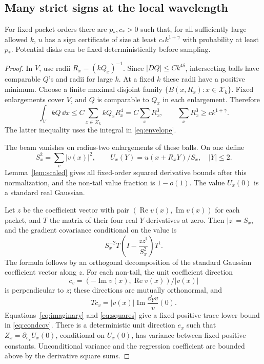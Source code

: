 \subsection{Many strict signs at the local wavelength}

\begin{lemma}\label{lem:signs}
For fixed packet orders there are \(p_*,c_*>0\) such that,
for all sufficiently large allowed \(k\), \(u\) has a sign
certificate of size at least \(c_*k^{1+\gamma}\) with
probability at least \(p_*\). Potential disks can be fixed
deterministically before sampling.
\end{lemma}

\begin{proof}
In \(V\), use radii \(R_x=(kQ_x)^{-1}\).
Since \(|D Q|\le Ck^{4\delta}\), intersecting balls have
comparable \(Q\)'s and radii for large \(k\).
At a fixed \(k\) these radii have a positive minimum.
Choose a finite maximal disjoint family
\(\{B(x,R_x):x\in\mathcal X_k\}\).
Fixed enlargements cover \(V\), and \(Q\) is comparable
to \(Q_x\) in each enlargement. Therefore
\begin{equation}\label{eq:packing}
 \int_V kQ\,\dd x\le C\sum_{x\in\mathcal X_k}
             kQ_xR_x^4=C\sum_xR_x^3,\qquad
 \sum_xR_x^3\ge ck^{1+\gamma}.
\end{equation}
The latter inequality uses the integral in \eqref{eq:envelope}.

The beam vanishes on radius-two enlargements of these balls.
On one define
\[
 S_x^2=\sum_v|v(x)|^2,\qquad
 U_x(Y)=u(x+R_xY)/S_x,\quad |Y|\le2.
\]
Lemma~\ref{lem:scaled} gives all fixed-order squared derivative
bounds after this normalization, and the non-tail value fraction
is \(1-o(1)\). The value \(U_x(0)\) is a standard real Gaussian.

Let \(z\) be the coefficient vector with pair
\((\operatorname{Re}v(x),\operatorname{Im}v(x))\) for each packet,
and \(T\) the matrix of their four real \(Y\)-derivatives at zero.
Then \(|z|=S_x\), and the gradient covariance conditional on
the value is
\begin{equation}\label{eq:condcov}
 S_x^{-2}T\left(I-\frac{zz^{\mathsf t}}{S_x^2}\right)T^{\mathsf t}.
\end{equation}
The formula follows by an orthogonal decomposition of the
standard Gaussian coefficient vector along \(z\).
For each non-tail, the unit coefficient direction
\[
 c_v=(-\operatorname{Im}v(x),\operatorname{Re}v(x))/|v(x)|
\]
is perpendicular to \(z\); these directions are mutually
orthonormal, and
\[
 T c_v=|v(x)|\operatorname{Im}\frac{\dd_Yv}{v}(0).
\]
Equations~\eqref{eq:imaginary} and \eqref{eq:squares} give a
fixed positive trace lower bound in \eqref{eq:condcov}.
There is a deterministic unit direction \(e_x\) such that
\(Z_x=\partial_{e_x}U_x(0)\), conditional on \(U_x(0)\),
has variance between fixed positive constants. Unconditional
variance and the regression coefficient are bounded above
by the derivative square sums.


\end{proof}
